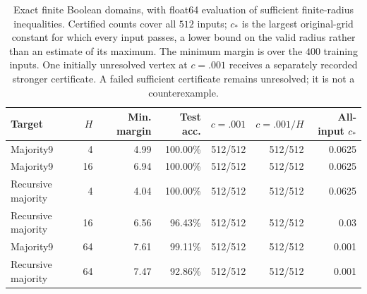 \begin{table}[t]
\centering\small
\begin{tabular}{lrrrrrr}
\toprule
Target & $H$ & Min. margin & Test acc. & $c=.001$ & $c=.001/H$ & All-input $c_*$ \\
\midrule
Majority9 & 4 & 4.99 & 100.00\% & 512/512 & 512/512 & 0.0625 \\
Majority9 & 16 & 6.94 & 100.00\% & 512/512 & 512/512 & 0.0625 \\
Recursive majority & 4 & 4.04 & 100.00\% & 512/512 & 512/512 & 0.0625 \\
Recursive majority & 16 & 6.56 & 96.43\% & 512/512 & 512/512 & 0.03 \\
Majority9 & 64 & 7.61 & 99.11\% & 512/512 & 512/512 & 0.001 \\
Recursive majority & 64 & 7.47 & 92.86\% & 512/512 & 512/512 & 0.001 \\
\bottomrule
\end{tabular}
\caption{Exact finite Boolean domains, with float64 evaluation of sufficient finite-radius inequalities. Certified counts cover all $512$ inputs; $c_*$ is the largest original-grid constant for which every input passes, a lower bound on the valid radius rather than an estimate of its maximum. The minimum margin is over the $400$ training inputs. One initially unresolved vertex at $c=.001$ receives a separately recorded stronger certificate. A failed sufficient certificate remains unresolved; it is not a counterexample.}
\label{tab:boolean-fullcube}
\end{table}
